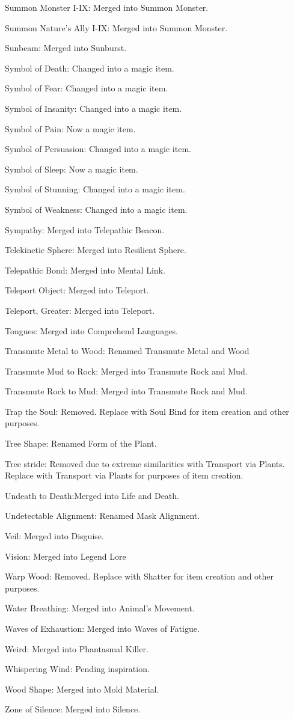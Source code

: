 {\begin{list}{}{\leftmargin=1em}
 \item Summon Monster I-IX: Merged into Summon Monster.
 \item Summon Nature's Ally I-IX: Merged into Summon Monster.
 \item Sunbeam: Merged into Sunburst.
 \item Symbol of Death: Changed into a magic item.
 \item Symbol of Fear: Changed into a magic item.
 \item Symbol of Insanity: Changed into a magic item.
 \item Symbol of Pain: Now a magic item.
 \item Symbol of Persuasion: Changed into a magic item.
 \item Symbol of Sleep: Now a magic item.
 \item Symbol of Stunning: Changed into a magic item.
 \item Symbol of Weakness: Changed into a magic item.
 \item Sympathy: Merged into Telepathic Beacon.
 \item Telekinetic Sphere: Merged into Resilient Sphere.
 \item Telepathic Bond: Merged into Mental Link.
 \item Teleport Object: Merged into Teleport.
 \item Teleport, Greater: Merged into Teleport.
 \item Tongues: Merged into Comprehend Languages.
 \item Transmute Metal to Wood: Renamed Transmute Metal and Wood
 \item Transmute Mud to Rock: Merged into Transmute Rock and Mud.
 \item Transmute Rock to Mud: Merged into Transmute Rock and Mud.
 \item Trap the Soul: Removed. Replace with Soul Bind for item creation and other purposes.
 \item Tree Shape: Renamed Form of the Plant.
 \item Tree stride: Removed due to extreme similarities with Transport via Plants. Replace with Transport via Plants for purposes of item creation.
 \item Undeath to Death:Merged into Life and Death.
 \item Undetectable Alignment: Renamed Mask Alignment.
 \item Veil: Merged into Disguise.
 \item Vision: Merged into Legend Lore
 \item Warp Wood: Removed. Replace with Shatter for item creation and other purposes.
 \item Water Breathing: Merged into Animal's Movement.
 \item Waves of Exhaustion: Merged into Waves of Fatigue.
 \item Weird: Merged into Phantasmal Killer.
 \item Whispering Wind: Pending inspiration.
 \item Wood Shape: Merged into Mold Material.
 \item Zone of Silence: Merged into Silence.
\end{list}}
